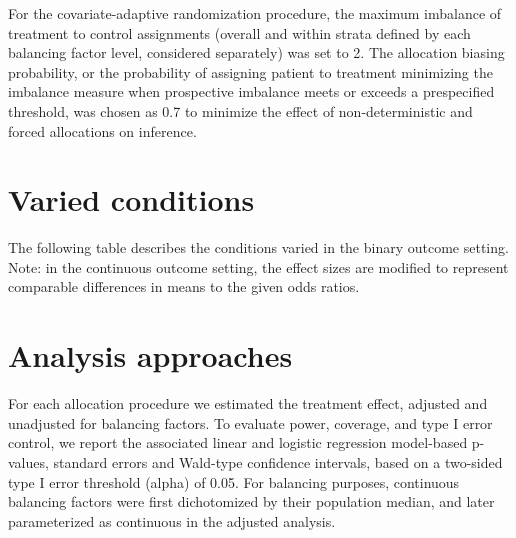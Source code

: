 For the covariate-adaptive randomization procedure, the maximum imbalance of treatment to control assignments (overall and within strata defined by each balancing factor level, considered separately) was set to 2.  
The allocation biasing probability, or the probability of assigning patient to treatment minimizing the imbalance measure when prospective imbalance meets or exceeds a prespecified threshold, was chosen as 0.7 to minimize the effect of non-deterministic and forced allocations on inference.

\section{Varied conditions}
The following table describes the conditions varied in the binary outcome setting. Note: in the continuous outcome setting, the effect sizes are modified to represent comparable differences in means to the given odds ratios.
\begin{comment}

Variable (notation)
Description
Associated parameters
Cardinality
Response (Y)
Binary outcome, with marginal prevalence p_Y 
p_Y = {0.1, 0.5}

2 dichotomous
1 continuous = 3

Treatment assignment (Z)
Treatment assignment is 0 or 1 with probability p_alloc.
p_alloc = {0.5}
1
Balancing factors (X)
Pre-specified risk factors predictive of outcome measure.
Continuous covariates dichotomized by population median.
numX = {1,2}
probsX = {0.25, 0.5}

2 dichotomous
1 continuous = 3
Entry time (T)
Observed entry time
-
1
Trial size (n)
Overall sample size 
n = {32, 96}
2
Effect size for treatment assignment and prognostic factors.
Magnitude of effect varied from
-	None: exp(bX) = 1.0
-	Low: exp(bX) = 1.1
-	High: exp(bX) = 3
bZ = {log(1.0), log(3)}
bX = {log(1.1), log(3)}
2 * 2 = 4
Effect size for drift
Magnitude of effect varied from
-	None: exp(bT) = 1.0
-	Severe: exp(bT) = 3
bT = {log(1.0), log(3)}
2

\end{comment}


\section{Analysis approaches}
For each allocation procedure we estimated the treatment effect, adjusted and unadjusted for balancing factors.  To evaluate power, coverage, and type I error control, we report the associated linear and logistic regression model-based p-values, standard errors and Wald-type confidence intervals, based on a two-sided type I error threshold (alpha) of 0.05.  For balancing purposes, continuous balancing factors were first dichotomized by their population median, and later parameterized as continuous in the adjusted analysis.

